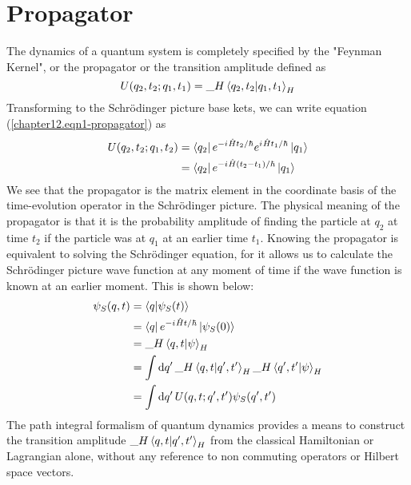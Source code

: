 	\section{Propagator}
	The dynamics of a quantum system is completely specified by the "Feynman Kernel", or the propagator or the transition amplitude defined as
	\begin{equation}
		U(q_2, t_2; q_1, t_1) = {\_H}\braket{q_2, t_2}{q_1, t_1}_H
		\label{chapter12.eqn1-propagator}
	\end{equation}
	Transforming to the Schr\"{o}dinger picture base kets, we can write equation (\ref{chapter12.eqn1-propagator}) as
	\begin{align}
		U(q_2, t_2; q_1, t_2) 
		&= \bra{q_2}e^{-{i\mkern1mu} \hat{H}t_2/\hbar} e^{{i\mkern1mu} \hat{H}t_1/\hbar} \ket{q_1} \nonumber \\
		&= \bra{q_2}e^{-{i\mkern1mu} \hat{H}(t_2-t_1)/\hbar} \ket{q_1} \label{chapter12.eqn2-propagator}
	\end{align}
	We see that the propagator is the matrix element in the coordinate basis of the time-evolution operator in the Schr\"{o}dinger picture. The physical meaning of the propagator is that it is the probability amplitude of finding the particle at $q_2$ at time $t_2$ if the particle was at $q_1$ at an earlier time $t_1$. Knowing the propagator is equivalent to solving the Schr\"{o}dinger equation, for it allows us to calculate the Schr\"{o}dinger picture wave function at any moment of time if the wave function is known at an earlier moment. This is shown below:
	\begin{align}
		\psi_S(q,t )
		&= \braket{q}{\psi_S(t)} \\
		&= \bra{q}e^{-{i\mkern1mu} \hat{H}t/\hbar} \ket{\psi_S(0)} \\
		&= {\_H}\braket{q,t}{\psi}_H \\
		&= \int \dd{q^\prime} {\_H}\braket{q,t}{q^\prime, t^\prime}_H {\_H}\braket{q^\prime, t^\prime}{\psi}_H \\
		&= \int \dd{q^\prime} U(q,t;q^\prime, t^\prime) \psi_S(q^\prime,t^\prime)
	\end{align}
	The path integral formalism of quantum dynamics provides a means to construct the transition amplitude ${\_H}\braket{q,t}{q^\prime, t^\prime}_H$ from the classical Hamiltonian or Lagrangian alone, without any reference to non commuting operators or Hilbert space vectors.\\
	
